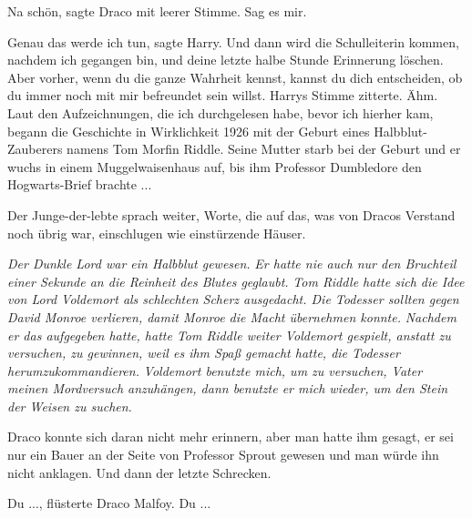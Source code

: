\glqq{}Na schön\grqq{}, sagte Draco mit leerer Stimme. \glqq{}Sag es mir.\grqq{}

\glqq{}Genau das werde ich tun\grqq{}, sagte Harry. \glqq{}Und dann wird die
Schulleiterin kommen, nachdem ich gegangen bin, und deine letzte halbe Stunde
Erinnerung löschen. Aber vorher, wenn du die ganze Wahrheit kennst, kannst du
dich entscheiden, ob du immer noch mit mir befreundet sein willst.\grqq{} Harrys
Stimme zitterte. \glqq{}Ähm. Laut den Aufzeichnungen, die ich durchgelesen habe,
bevor ich hierher kam, begann die Geschichte in Wirklichkeit 1926 mit der Geburt
eines Halbblut-Zauberers namens Tom Morfin Riddle. Seine Mutter starb bei der
Geburt und er wuchs in einem Muggelwaisenhaus auf, bis ihm Professor Dumbledore
den Hogwarts-Brief brachte ...\grqq{}

Der Junge-der-lebte sprach weiter, Worte, die auf das, was von Dracos Verstand
noch übrig war, einschlugen wie einstürzende Häuser.

\emph{Der Dunkle Lord war ein Halbblut gewesen.}
\emph{Er hatte nie auch nur den Bruchteil einer Sekunde an die Reinheit des
Blutes geglaubt.} \emph{Tom Riddle hatte sich die Idee von Lord Voldemort als
schlechten Scherz ausgedacht. Die Todesser sollten gegen David Monroe verlieren,
damit Monroe die Macht übernehmen konnte.} \emph{Nachdem er das aufgegeben
hatte, hatte Tom Riddle weiter Voldemort gespielt, anstatt zu versuchen, zu
gewinnen, weil es ihm Spaß gemacht hatte, die Todesser herumzukommandieren.}
\emph{Voldemort benutzte mich, um zu versuchen, Vater meinen Mordversuch
anzuhängen, dann benutzte er mich wieder, um den Stein der Weisen zu suchen.}

Draco konnte sich daran nicht mehr erinnern, aber man hatte ihm gesagt, er sei
nur ein Bauer an der Seite von Professor Sprout gewesen und man würde ihn nicht
anklagen. Und dann der letzte Schrecken.

\glqq{}Du ...\grqq{}, flüsterte Draco Malfoy. \glqq{}Du ...\grqq{}

